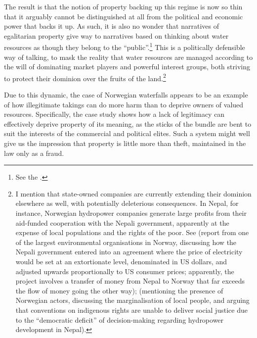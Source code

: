 The result is that the notion of property backing up this regime is now so thin that it arguably cannot be distinguished at all from the political and economic power that backs it up. As such, it is also no wonder that narratives of egalitarian property give way to narratives based on thinking about water resources as though they belong to the ``public''.\footnote{See the \dni\cite[1]{ica17}.} This is a politically defensible way of talking, to mask the reality that water resources are managed according to the will of dominating market players and powerful interest groups, both striving to protect their dominion over the fruits of the land.\footnote{I mention that state-owned companies are currently extending their dominion elsewhere as well, with potentially deleterious consequences. In Nepal, for instance, Norwegian hydropower companies generate large profits from their aid-funded cooperation with the Nepali government, apparently at the expense of local populations and the rights of the poor. See \cite{gaarder15} (report from one of the largest environmental organisations in Norway, discussing how the Nepali government entered into an agreement where the price of electricity would be set at an extortionate level, denominated in US dollars, and adjusted upwards proportionally to US consumer prices; apparently, the project involves a transfer of money from Nepal to Norway that far exceeds the flow of money going the other way); \cite[644]{peris12} (mentioning the presence of Norwegian actors, discussing the marginalisation of local people, and arguing that conventions on indigenous rights are unable to deliver social justice due to the ``democratic deficit'' of decision-making regarding hydropower development in Nepal).}

Due to this dynamic, the case of Norwegian waterfalls appears to be an example of how illegitimate takings can do more harm than to deprive owners of valued resources. Specifically, the case study shows how a lack of legitimacy can effectively deprive property of its meaning, as the sticks of the 
bundle are bent to suit the interests of the commercial and political elites. Such a system might well give us the impression that property is little more than theft, maintained in the law only as a fraud.

